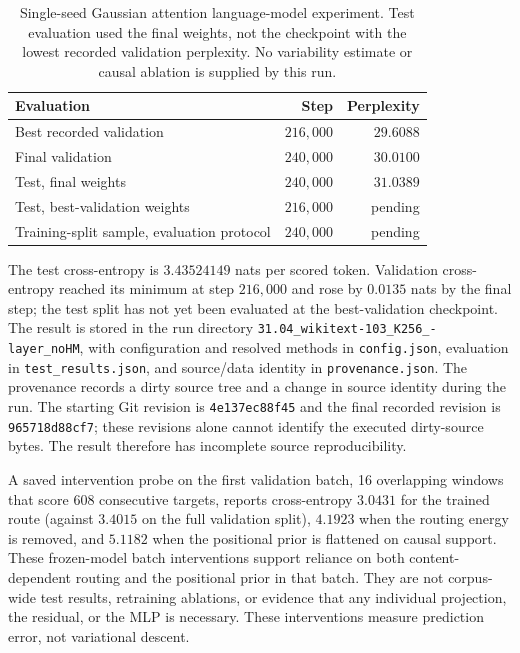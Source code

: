 \documentclass[twoside,11pt]{article}
\begin{document}
\begin{table}[H]
\centering
\begin{tabular}{lrr}
\toprule
Evaluation & Step & Perplexity \\
\midrule
Best recorded validation & $216{,}000$ & $29.6088$ \\
Final validation & $240{,}000$ & $30.0100$ \\
Test, final weights & $240{,}000$ & $31.0389$ \\
Test, best-validation weights & $216{,}000$ & pending \\ %
Training-split sample, evaluation protocol & $240{,}000$ & pending \\ %
\bottomrule
\end{tabular}
\caption{Single-seed Gaussian attention language-model experiment. Test evaluation used the final weights, not the checkpoint with the lowest recorded validation perplexity. No variability estimate or causal ablation is supplied by this run.}
\label{tab:relational_run}
\end{table}

The test cross-entropy is $3.43524149$ nats per scored token. Validation cross-entropy reached its minimum at step $216{,}000$ and rose by $0.0135$ nats by the final step; the test split has not yet been evaluated at the best-validation checkpoint. The result is stored in the run directory \texttt{31.04\_\allowbreak wikitext-103\_\allowbreak K256\_-layer\_\allowbreak noHM}, with configuration and resolved methods in \texttt{config.json}, evaluation in \texttt{test\_\allowbreak results.json}, and source/data identity in \texttt{provenance.json}. The provenance records a dirty source tree and a change in source identity during the run. The starting Git revision is \texttt{4e137ec88f45} and the final recorded revision is \texttt{965718d88cf7}; these revisions alone cannot identify the executed dirty-source bytes. The result therefore has incomplete source reproducibility.

A saved intervention probe on the first validation batch, 16 overlapping windows that score 608 consecutive targets, reports cross-entropy $3.0431$ for the trained route (against $3.4015$ on the full validation split), $4.1923$ when the routing energy is removed, and $5.1182$ when the positional prior is flattened on causal support. These frozen-model batch interventions support reliance on both content-dependent routing and the positional prior in that batch. They are not corpus-wide test results, retraining ablations, or evidence that any individual projection, the residual, or the MLP is necessary. These interventions measure prediction error, not variational descent.
\end{document}

